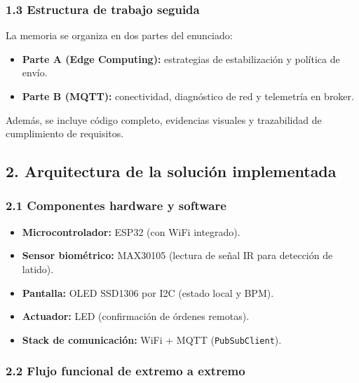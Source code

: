 \documentclass[11pt]{article}
\providecommand{\tightlist}{%
      \setlength{\itemsep}{0pt}\setlength{\parskip}{0pt}}
\begin{document}
\subsubsection{1.3 Estructura de trabajo
seguida}\label{estructura-de-trabajo-seguida}

La memoria se organiza en dos partes del enunciado:

\begin{itemize}
\tightlist
\item
  \textbf{Parte A (Edge Computing):} estrategias de estabilización y
  política de envío.
\item
  \textbf{Parte B (MQTT):} conectividad, diagnóstico de red y telemetría
  en broker.
\end{itemize}

Además, se incluye código completo, evidencias visuales y trazabilidad
de cumplimiento de requisitos.

    \subsection{2. Arquitectura de la solución
implementada}\label{arquitectura-de-la-soluciuxf3n-implementada}

\subsubsection{2.1 Componentes hardware y
software}\label{componentes-hardware-y-software}

\begin{itemize}
\tightlist
\item
  \textbf{Microcontrolador:} ESP32 (con WiFi integrado).
\item
  \textbf{Sensor biométrico:} MAX30105 (lectura de señal IR para
  detección de latido).
\item
  \textbf{Pantalla:} OLED SSD1306 por I2C (estado local y BPM).
\item
  \textbf{Actuador:} LED (confirmación de órdenes remotas).
\item
  \textbf{Stack de comunicación:} WiFi + MQTT (\texttt{PubSubClient}).
\end{itemize}

\subsubsection{2.2 Flujo funcional de extremo a
extremo}\label{flujo-funcional-de-extremo-a-extremo}
\end{document}
